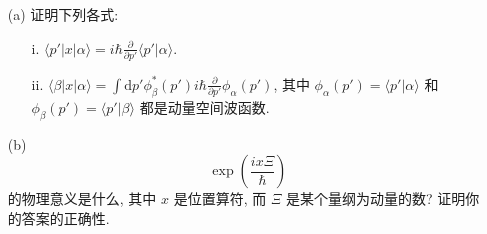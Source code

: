 \documentclass{assignment}
\begin{document}
\begin{prob}[课本习题 1.33]
    \begin{itemize}
        \item[(a)] 证明下列各式:
        \begin{itemize}
            \item[i.] $\langle p'\rvert x\lvert\alpha\rangle=i\hbar\frac{\partial}{\partial p'}\langle p'\vert\alpha\rangle$.
            \item[ii.] $\langle\beta\rvert x\lvert\alpha\rangle=\int\mathrm{d}p'\phi_{\beta}^*(p')i\hbar\frac{\partial}{\partial p'}\phi_{\alpha}(p')$, 其中 $\phi_{\alpha}(p')=\langle p'\vert\alpha\rangle$ 和 $\phi_{\beta}(p')=\langle p'\vert\beta\rangle$ 都是动量空间波函数.
        \end{itemize}
        \item[(b)] 
        \[
            \exp\left(\frac{ix\Xi}{\hbar}\right)
        \]
        的物理意义是什么, 其中 $x$ 是位置算符, 而 $\Xi$ 是某个量纲为动量的数? 证明你的答案的正确性.
    \end{itemize}
\end{prob}
\end{document}
